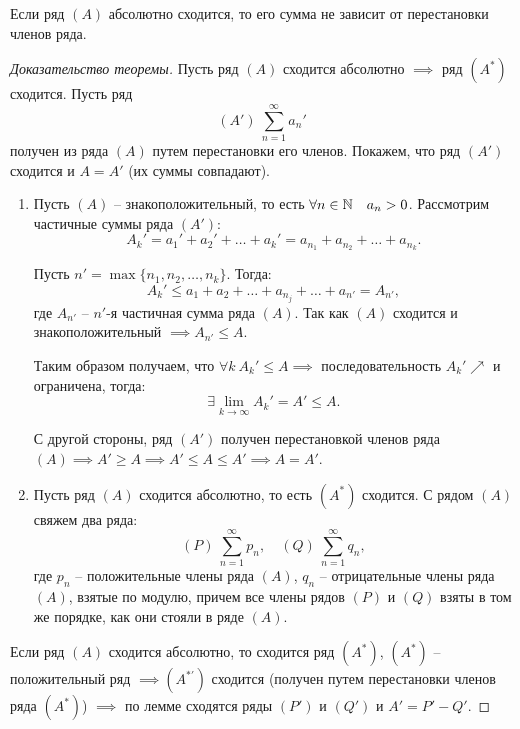 \begin{theorem}
    Если ряд $(A)$ абсолютно сходится, то его сумма не зависит от перестановки членов ряда.
\end{theorem}

\begin{proof}[Доказательство теоремы]
    Пусть ряд $ (A) $ сходится абсолютно $\implies$ ряд $ (A^*) $ сходится. Пусть ряд
    \[
        (A') \ \sum_{n=1}^{\infty}a_n'
    \]
    получен из ряда $(A)$ путем перестановки его членов. Покажем, что ряд $(A')$ сходится и $A = A'$ (их суммы совпадают).

    \begin{enumerate}
        \item Пусть $(A)$ -- знакоположительный, то есть $\forall n \in \mathbb{N} \quad a_n > 0$. Рассмотрим частичные суммы ряда $(A')$:
              \[
                  A_k' = a_1' + a_2' + \ldots + a_k' = a_{n_1} + a_{n_2} + \ldots + a_{n_k}.
              \]

              Пусть $n' = \max\{n_1,n_2,\ldots,n_k\}$. Тогда:
              \[
                  A_k' \leqslant a_1 + a_2 + \ldots + a_{n_j} + \ldots + a_{n'} = A_{n'},
              \]
              где $A_{n'}$ -- $n'$-я частичная сумма ряда $(A)$. Так как $(A)$ сходится и знакоположительный $\implies A_{n'} \leqslant A$.

              Таким образом получаем, что $\forall k \ A_k' \leqslant A \implies$ последовательность $A_k' \nearrow$ и ограничена, тогда:
              \[
                  \exists\underset{k\rightarrow\infty}{\lim}A_k' = A' \leqslant A.
              \]

              С другой стороны, ряд $(A')$ получен перестановкой членов ряда $(A) \implies A' \geqslant A \implies A' \leqslant A \leqslant A' \implies A = A'$.

        \item Пусть ряд $(A)$ сходится абсолютно, то есть $(A^*)$ сходится. С рядом $(A)$ свяжем два ряда:
              \[
                  (P) \ \sum_{n=1}^{\infty}p_n, \quad (Q) \ \sum_{n=1}^{\infty}q_n,
              \]
              где $p_n$ -- положительные члены ряда $(A)$, $q_n$ -- отрицательные члены ряда $(A)$, взятые по модулю, причем все члены рядов $(P)$ и $(Q)$ взяты в том же порядке, как они стояли в ряде $(A)$.
    \end{enumerate}

    Если ряд $(A)$ сходится абсолютно, то сходится ряд $(A^*)$, $(A^*)$ -- положительный ряд $\implies (A^{*'})$ сходится (получен путем перестановки членов ряда $(A^*)$) $\implies$ по лемме сходятся ряды $(P')$ и $(Q')$ и $A' = P' - Q'$.


\end{proof}
